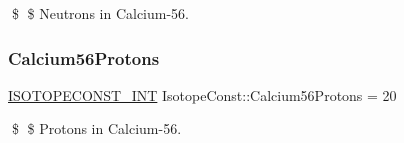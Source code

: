 \$ \$ Neutrons in Calcium-\/56. \mbox{\label{group___isotope_const-_calcium-_ca56_gaa0ae750d3c6d0648b5f11b874dadf1cb}} 
\subsubsection{\texorpdfstring{Calcium56\+Protons}{Calcium56Protons}}
{\footnotesize\ttfamily \mbox{\hyperlink{group___isotope_const-_macros_ga5f18360b3e99483a35c32d789e62621c}{I\+S\+O\+T\+O\+P\+E\+C\+O\+N\+S\+T\+\_\+\+I\+NT}} Isotope\+Const\+::\+Calcium56\+Protons = 20}

\$ \$ Protons in Calcium-\/56. 